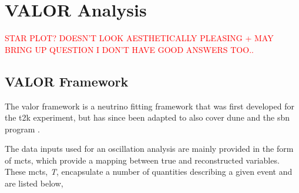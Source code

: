 \chapter{VALOR Analysis}
\label{chap:VALOR}

\textcolor{red}{STAR PLOT? DOESN'T LOOK AESTHETICALLY PLEASING + MAY BRING UP QUESTION I DON'T HAVE GOOD ANSWERS TOO.. }

\section{VALOR Framework}\label{sec:VALOR_framework}

The \gls{valor} framework is a neutrino fitting framework that was first developed for the \gls{t2k} experiment, but has since been adapted to also cover \gls{dune} and the \gls{sbn} program \cite{VALOR}.

The data inputs used for an oscillation analysis are mainly provided in the form of \glspl{mct}, which provide a mapping between true and reconstructed variables. These \glspl{mct}, \textit{T}, encapsulate a number of quantities describing a given event and are listed below,

